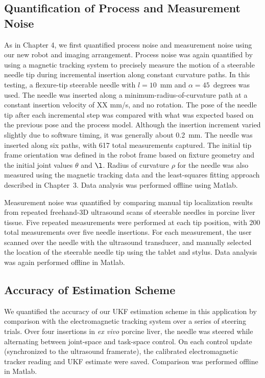 \subsection{Quantification of Process and Measurement Noise}
As in Chapter 4, we first quantified process noise and measurement noise using our new robot and imaging arrangement. Process noise was again quantified by using a magnetic tracking system to precisely measure the motion of a steerable needle tip during incremental insertion along constant curvature paths. In this testing, a flexure-tip steerable needle with $l = 10$~mm and $\alpha = 45$~degrees was used. The needle was inserted along a minimum-radius-of-curvature path at a constant insertion velocity of XX mm/s, and no rotation. The pose of the needle tip after each incremental step was compared with what was expected based on the previous pose and the process model. Although the insertion increment varied slightly due to software timing, it was generally about 0.2~mm. The needle was inserted along six paths, with 617 total measurements captured. The initial tip frame orientation was defined in the robot frame based on fixture geometry and the initial joint values $\theta$ and $\l$. Radius of curvature $\rho$ for the needle was also measured using the magnetic tracking data and the least-squares fitting approach described in Chapter~3. Data analysis was performed offline using Matlab. 

Measurement noise was quantified by comparing manual tip localization results from repeated freehand-3D ultrasound scans of steerable needles in porcine liver tissue. Five repeated measurements were performed at each tip position, with 200 total measurements over five needle insertions. For each measurement, the user scanned over the needle with the ultrasound transducer, and manually selected the location of the steerable needle tip using the tablet and stylus. Data analysis was again performed offline in Matlab.

\subsection{Accuracy of Estimation Scheme}
We quantified the accuracy of our UKF estimation scheme in this application by comparison with the electromagnetic tracking system over a series of steering trials. Over four insertions in \textit{ex vivo} porcine liver, the needle was steered while alternating between joint-space and task-space control. On each control update (synchronized to the ultrasound framerate), the calibrated electromagnetic tracker reading and UKF estimate were saved. Comparison was performed offline in Matlab.

